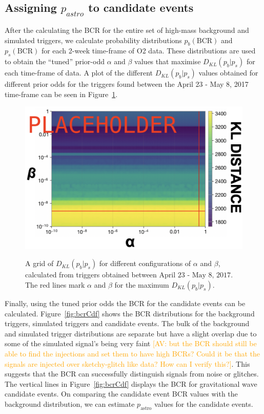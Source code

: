 \documentclass[%
preprint,
 amsmath,amssymb,
 aps,
]{revtex4}
\newcommand{\bcr}{{\sc BCR}\xspace}
\newcommand{\av}[1]{\textcolor{orange}{[AV: #1]}}
\begin{document}
\subsection{Assigning $p_{astro}$ to candidate events}

After the calculating the \bcr for the entire set of high-mass background and simulated triggers, we calculate probability distributions $p_b(\text{BCR})$ and $p_s(\text{BCR})$ for each 2-week time-frame of O2 data. These distributions are used to obtain the ``tuned'' prior-odd $\alpha$ and $\beta$ values that maximise $D_{KL}(p_b|p_s)$ for each time-frame of data. A plot of the different $D_{KL}(p_b|p_s)$ values obtained for different prior odds for the triggers found between the April 23 - May 8, 2017 time-frame can be seen in Figure~\ref{fig:Dkl}. \\

\begin{figure}[!h]
{\centering \includegraphics[width=0.75\linewidth]{images/kl_divergence_grid.png} }
\caption[Grid of KL-Distances for different prior odds]{A grid of $D_{KL}(p_b|p_s)$ for different configurations of $\alpha$ and $\beta$, calculated from triggers obtained between $\text{April 23 - May 8, 2017}$. The red lines mark $\alpha$ and $\beta$ for the maximum $D_{KL}(p_b|p_s)$.}\label{fig:Dkl}
\end{figure}


Finally, using the tuned prior odds the \bcr for the candidate events can be calculated. Figure~\ref{fig:bcrCdf} shows the \bcr distributions for the background triggers, simulated triggers and candidate events. The bulk of the background and simulated trigger distributions are separate but have a slight overlap due to some of the simulated signal's being very faint \av{but the BCR should still be able to find the injections and set them to have high BCRs? Could it be that the signals are injected over sketchy-glitch like data? How can I verify this?}. This suggests that the \bcr can successfully distinguish signals from noise or glitches. The vertical lines in Figure~\ref{fig:bcrCdf} displays the \bcr for gravitational wave candidate events. On comparing the candidate event \bcr values with the background distribution, we can estimate $p_\text{astro}$ values for the candidate events. 
\end{document}
